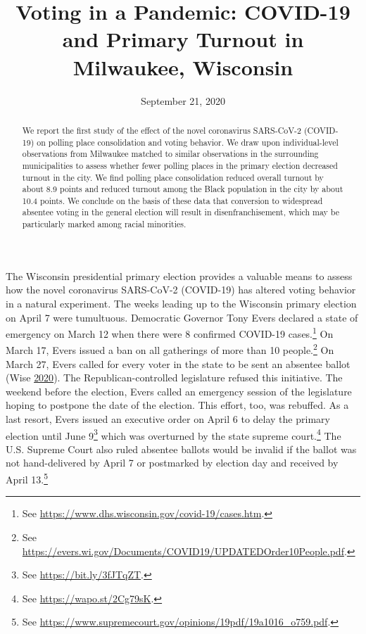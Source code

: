\documentclass[
  12pt,
]{article}
\title{Voting in a Pandemic: COVID-19 and Primary Turnout in Milwaukee, Wisconsin}
\author{}
\date{\vspace{-2.5em}September 21, 2020}
\begin{document}
\maketitle
\begin{abstract}
We report the first study of the effect of the novel coronavirus SARS-CoV-2 (COVID-19) on polling place consolidation and voting behavior. We draw upon individual-level observations from Milwaukee matched to similar observations in the surrounding municipalities to assess whether fewer polling places in the primary election decreased turnout in the city. We find polling place consolidation reduced overall turnout by about 8.9 points and reduced turnout among the Black population in the city by about 10.4 points. We conclude on the basis of these data that conversion to widespread absentee voting in the general election will result in disenfranchisement, which may be particularly marked among racial minorities.
\end{abstract}

\pagebreak

\doublespacing

The Wisconsin presidential primary election provides a valuable means to assess how the novel coronavirus SARS-CoV-2 (COVID-19) has altered voting behavior in a natural experiment. The weeks leading up to the Wisconsin primary election on April 7 were tumultuous. Democratic Governor Tony Evers declared a state of emergency on March 12 when there were 8 confirmed COVID-19 cases.\footnote{See \url{https://www.dhs.wisconsin.gov/covid-19/cases.htm}.} On March 17, Evers issued a ban on all gatherings of more than 10 people.\footnote{See \url{https://evers.wi.gov/Documents/COVID19/UPDATEDOrder10People.pdf}.} On March 27, Evers called for every voter in the state to be sent an absentee ballot (Wise \protect\hyperlink{ref-Wise2020}{2020}). The Republican-controlled legislature refused this initiative. The weekend before the election, Evers called an emergency session of the legislature hoping to postpone the date of the election. This effort, too, was rebuffed. As a last resort, Evers issued an executive order on April 6 to delay the primary election until June 9\footnote{See \url{https://bit.ly/3fJTqZT}.} which was overturned by the state supreme court.\footnote{See \url{https://wapo.st/2Cg79sK}.} The U.S. Supreme Court also ruled absentee ballots would be invalid if the ballot was not hand-delivered by April 7 or postmarked by election day and received by April 13.\footnote{See \url{https://www.supremecourt.gov/opinions/19pdf/19a1016_o759.pdf}.}
\end{document}

